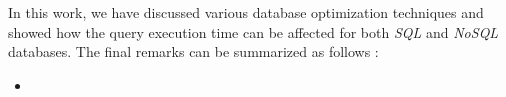 In this work, we have discussed various database optimization techniques and showed how the query execution time can be affected for both \emph{SQL} and \emph{NoSQL} databases. The final remarks can be summarized as follows :
\begin{itemize}
    \item 
\end{itemize}